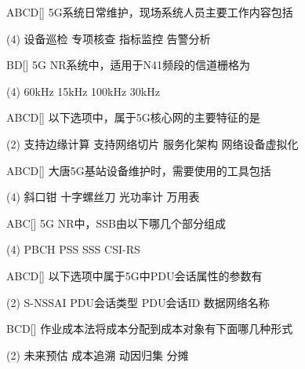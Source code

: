 \begin{choice}{\;ABCD\;}[]
    5G系统日常维护，现场系统人员主要工作内容包括
    \begin{tasks}(4)
        \task 设备巡检
        \task 专项核查
        \task 指标监控
        \task 告警分析
    \end{tasks}
\end{choice}

\begin{choice}{\;BD\;}[]
    5G NR系统中，适用于N41频段的信道栅格为
    \begin{tasks}(4)
        \task 60kHz
        \task 15kHz
        \task 100kHz
        \task 30kHz
    \end{tasks}
\end{choice}

\begin{choice}{\;ABCD\;}[]
    以下选项中，属于5G核心网的主要特征的是
    \begin{tasks}(2)
        \task 支持边缘计算
        \task 支持网络切片
        \task 服务化架构
        \task 网络设备虚拟化
    \end{tasks}
\end{choice}

\begin{choice}{\;ABCD\;}[]
    大唐5G基站设备维护时，需要使用的工具包括
    \begin{tasks}(4)
        \task 斜口钳
        \task 十字螺丝刀
        \task  光功率计
        \task 万用表
    \end{tasks}
\end{choice}

\begin{choice}{\;ABC\;}[]
    5G NR中，SSB由以下哪几个部分组成
    \begin{tasks}(4)
        \task PBCH
        \task PSS
        \task SSS
        \task CSI-RS
    \end{tasks}
\end{choice}

\begin{choice}{\;ABCD\;}[]
    以下选项中属于5G中PDU会话属性的参数有
    \begin{tasks}(2)
        \task S-NSSAI
        \task PDU会话类型
        \task PDU会话ID
        \task 数据网络名称
    \end{tasks}
\end{choice}

\begin{choice}{\;BCD\;}[]
    作业成本法将成本分配到成本对象有下面哪几种形式
    \begin{tasks}(2)
        \task 未来预估
        \task 成本追溯
        \task 动因归集
        \task 分摊
    \end{tasks}
\end{choice}

